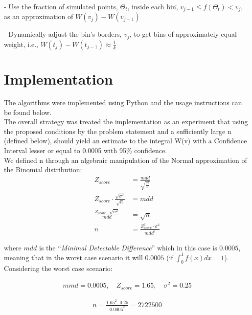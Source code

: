 \documentclass[12pt]{article}
\begin{document}
- Use the fraction of simulated points, $\Theta_t$, inside each
\"bin\", $v_{j-1} \leq f(\Theta_t) < v_j$, as an approximation of 
$W(v_j) - W(v_{j - 1})$

- Dynamically adjust the bin's borders, $v_j$, to get bins of approximately
equal weight, i.e., $W(t_j) - W(t_{j-1}) \approx \frac{1}{k}$

\section*{Implementation}

The algorithms were implemented using Python and the usage instructions can be found below. \\
The overall strategy was treated the implementation as an experiment that using the proposed conditions by the problem statement and a sufficiently large n (defined below), should yield an estimate to the integral W(v) with a Confidence Interval lesser or equal to 0.0005 with 95\% confidence.\\
We defined n through an algebraic manipulation of the Normal approximation of the Binomial distribution:
\begin{align}
Z_{score} & = \frac{mdd}{\sqrt{\frac{\sigma^{2}}{n}}}\nonumber\\
Z_{score}\cdot\frac{\sqrt{\sigma^{2}}}{\sqrt{n}} & = mdd\nonumber\\
\frac{Z_{score}\cdot\sqrt{\sigma^{2}}}{mdd} & = \sqrt{n}\nonumber\\
n &= \frac{Z_{score}^{2}\cdot\sigma^{2}}{mdd^{2}}
\end{align}

where $mdd$ is the ``\textit{Minimal Detectable Difference}'' which in this case is $0.0005$, meaning that in the worst case scenario it will $0.0005$ (if $\int_{0}^{1}f(x)dx=1$). Considering the worst case scenario:

\begin{eqnarray}
mmd = 0.0005,\quad Z_{score} = 1.65,\quad \sigma^{2} = 0.25
\end{eqnarray}

\begin{eqnarray}
n = \frac{1.65^{2} \cdot 0.25}{0.0005^{2}} = 2722500
\end{eqnarray}
\end{document}

